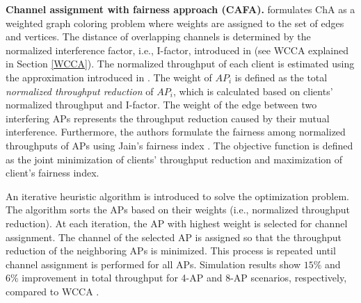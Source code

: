 \label{CAFA}
\textbf{Channel assignment with fairness approach (CAFA).}
\cite{CA-F-WCNC-11} formulates ChA as a weighted graph coloring problem where weights are assigned to the set of edges and vertices. 
The distance of overlapping channels is determined by the normalized interference factor, i.e., I-factor, introduced in \cite{Wcolor-2005} (see WCCA explained in Section \ref{WCCA}). 
The normalized throughput of each client is estimated using the approximation introduced in \cite{Thr-estimation-2005}. 
The weight of $AP_i$ is defined as the total \textit{normalized throughput reduction} of $AP_i$, which is calculated based on clients' normalized throughput and I-factor. 
The weight of the edge between two interfering APs represents the throughput reduction caused by their mutual interference.
Furthermore, the authors formulate the fairness among normalized throughputs of APs using Jain's fairness index \cite{Jain's-fairness}. 
The objective function is defined as the joint minimization of clients' throughput reduction and maximization of client's fairness index. 

An iterative heuristic algorithm is introduced to solve the optimization problem. 
The algorithm sorts the APs based on their weights (i.e., normalized throughput reduction).  
At each iteration, the AP with highest weight is selected for channel assignment. 
The channel of the selected AP is assigned so that the throughput reduction of the neighboring APs is minimized.
This process is repeated until channel assignment is performed for all APs. 
Simulation results show $15\%$ and $6\%$ improvement in total throughput for 4-AP and 8-AP scenarios, respectively, compared to WCCA \cite{Wcolor-2005}. 




